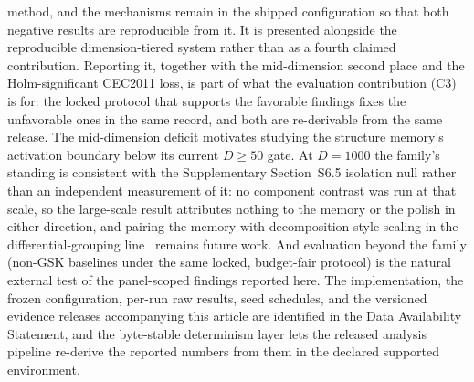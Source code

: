 method, and the mechanisms remain in the shipped configuration so that both
negative results are reproducible from it.
It is
presented alongside the reproducible dimension-tiered system rather than as a
fourth claimed contribution. Reporting it, together with the mid-dimension
second place and the Holm-significant CEC2011 loss, is part of what the
evaluation contribution (C3) is for: the locked protocol that supports the
favorable findings fixes the unfavorable ones in the same record, and both are
re-derivable from the same release.
The mid-dimension deficit
motivates studying the structure memory's activation boundary below its
current $D \geq 50$ gate. At $D = 1000$ the family's standing is
consistent with the Supplementary Section~S6.5 isolation null rather than an
independent measurement of it: no component contrast was run at that
scale, so the large-scale result attributes nothing to the memory or the
polish in either direction, and pairing the memory with
decomposition-style scaling in the differential-grouping
line~\cite{omidvar2014dg} remains future work.
And evaluation beyond the family (non-GSK baselines under the same
locked, budget-fair protocol) is the natural external test of the
panel-scoped findings reported here. The implementation, the frozen
configuration, per-run raw results, seed schedules, and the versioned
evidence releases accompanying this article are identified in the Data
Availability Statement, and the byte-stable determinism layer
lets the released analysis pipeline re-derive the reported
numbers from them in the declared supported environment. %
